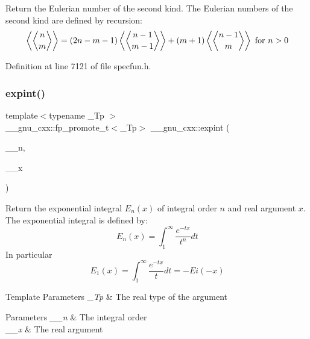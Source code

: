 Return the Eulerian number of the second kind. The Eulerian numbers of the second kind are defined by recursion\+: \[ \left\langle\genfrac{\langle}{\rangle}{0pt}{0}{n}{m}\right\rangle = (2n-m-1) \left\langle\genfrac{\langle}{\rangle}{0pt}{0}{n-1}{m-1}\right\rangle + (m+1) \left\langle\genfrac{\langle}{\rangle}{0pt}{0}{n-1}{m}\right\rangle \mbox{ for } n > 0 \] 

Definition at line 7121 of file specfun.\+h.

\mbox{\label{group__gnu__math__spec__func_gadaf9317953b826975da72d1858f01ea5}} 
\subsubsection{\texorpdfstring{expint()}{expint()}}
{\footnotesize\ttfamily template$<$typename \+\_\+\+Tp $>$ \\
\+\_\+\+\_\+gnu\+\_\+cxx\+::fp\+\_\+promote\+\_\+t$<$\+\_\+\+Tp$>$ \+\_\+\+\_\+gnu\+\_\+cxx\+::expint (\begin{DoxyParamCaption}\item[{unsigned int}]{\+\_\+\+\_\+n,  }\item[{\+\_\+\+Tp}]{\+\_\+\+\_\+x }\end{DoxyParamCaption})\hspace{0.3cm}{\ttfamily [inline]}}

Return the exponential integral $ E_n(x) $ of integral order $ n $ and real argument $ x $. The exponential integral is defined by\+: \[ E_n(x) = \int_1^\infty \frac{e^{-tx}}{t^n}dt \] In particular \[ E_1(x) = \int_1^\infty \frac{e^{-tx}}{t}dt = -Ei(-x) \]


\begin{DoxyTemplParams}{Template Parameters}
{\em \+\_\+\+Tp} & The real type of the argument \\
\hline
\end{DoxyTemplParams}

\begin{DoxyParams}{Parameters}
{\em \+\_\+\+\_\+n} & The integral order \\
\hline
{\em \+\_\+\+\_\+x} & The real argument \\
\hline
\end{DoxyParams}


